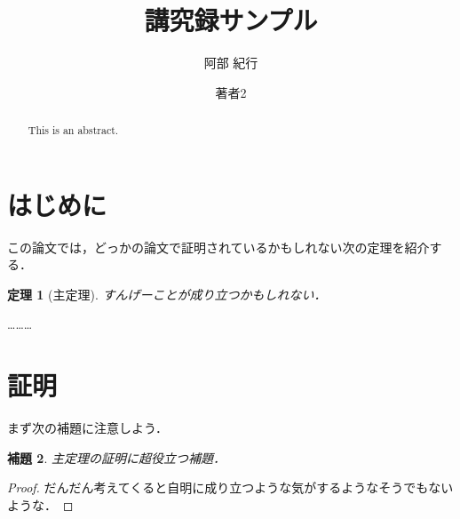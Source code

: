 \documentclass[12pt,a4paper,dvipdfmx]{jsarticle}
\title{講究録サンプル}
\author{阿部 紀行}{北海道大学 理学研究院}{Noriyuki Abe}{Department of Mathematics, Hokkaido University}
\author{著者2}{所属2}{Author 2}{Institute 2} %
\theoremstyle{jplain}
\newtheorem{thm}{定理}[section]
\newtheorem{lem}[thm]{補題}
\begin{document}
\maketitle
\begin{abstract}
This is an abstract.
\end{abstract}
\section{はじめに}
この論文では，どっかの論文で証明されているかもしれない次の定理を紹介する．
\begin{thm}[主定理]
すんげーことが成り立つかもしれない．
\end{thm}

………

\section{証明}
まず次の補題に注意しよう．
\begin{lem}
主定理の証明に超役立つ補題．
\end{lem}
\begin{proof}
だんだん考えてくると自明に成り立つような気がするようなそうでもないような．
\end{proof}
\end{document}
